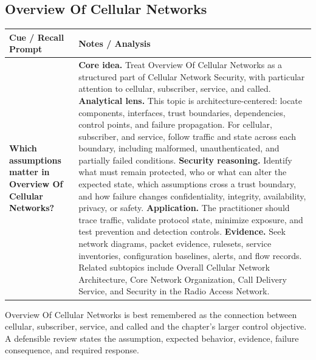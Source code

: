 \documentclass[11pt]{article}
\newcommand{\CornellHeader}{%
\rowcolor{Navy}\color{white}\bfseries Cue / Recall Prompt & \color{white}\bfseries Notes / Analysis\\\hline}
\newcommand{\CornellRow}[2]{%
\cellcolor{CueGray}\RaggedRight\textbf{#1} & \RaggedRight #2\\\hline}
\begin{document}
\subsection*{Overview Of Cellular Networks}
\begin{longtable}{>{\RaggedRight\arraybackslash}p{}|>{\RaggedRight\arraybackslash}p{}}
\CornellHeader
\CornellRow{Which assumptions matter in Overview Of Cellular Networks?}{\textbf{Core idea.} Treat Overview Of Cellular Networks as a structured part of Cellular Network Security, with particular attention to cellular, subscriber, service, and called. \textbf{Analytical lens.} This topic is architecture-centered: locate components, interfaces, trust boundaries, dependencies, control points, and failure propagation. For cellular, subscriber, and service, follow traffic and state across each boundary, including malformed, unauthenticated, and partially failed conditions. \textbf{Security reasoning.} Identify what must remain protected, who or what can alter the expected state, which assumptions cross a trust boundary, and how failure changes confidentiality, integrity, availability, privacy, or safety. \textbf{Application.} The practitioner should trace traffic, validate protocol state, minimize exposure, and test prevention and detection controls. \textbf{Evidence.} Seek network diagrams, packet evidence, rulesets, service inventories, configuration baselines, alerts, and flow records. Related subtopics include Overall Cellular Network Architecture, Core Network Organization, Call Delivery Service, and Security in the Radio Access Network.}
\end{longtable}
\begin{topicsummary}
Overview Of Cellular Networks is best remembered as the connection between cellular, subscriber, service, and called and the chapter's larger control objective. A defensible review states the assumption, expected behavior, evidence, failure consequence, and required response.
\end{topicsummary}
\end{document}
